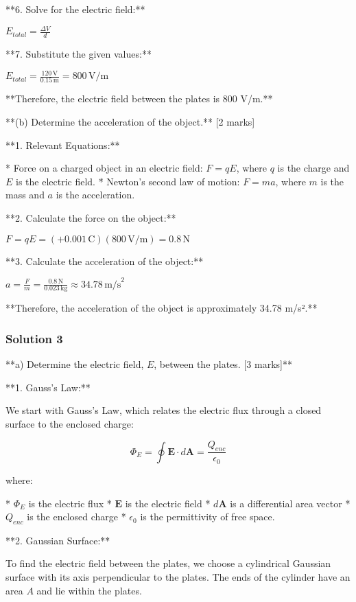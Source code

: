 \documentclass{article}
\begin{document}
**6. Solve for the electric field:**

$E_{total} = \frac{\Delta V}{d}$

**7. Substitute the given values:**

$E_{total} = \frac{120 \, \text{V}}{0.15 \, \text{m}} = 800 \, \text{V/m}$

**Therefore, the electric field between the plates is 800 V/m.**

**(b) Determine the acceleration of the object.** [2 marks]

**1. Relevant Equations:**

*   Force on a charged object in an electric field: $F = qE$, where $q$ is the charge and $E$ is the electric field.
*   Newton's second law of motion: $F = ma$, where $m$ is the mass and $a$ is the acceleration.

**2. Calculate the force on the object:**

$F = qE = (+0.001 \, \text{C})(800 \, \text{V/m}) = 0.8 \, \text{N}$

**3. Calculate the acceleration of the object:**

$a = \frac{F}{m} = \frac{0.8 \, \text{N}}{0.023 \, \text{kg}} \approx 34.78 \, \text{m/s}^2$

**Therefore, the acceleration of the object is approximately 34.78 m/s².** 

\subsubsection{Solution 3}
**a) Determine the electric field, $E$, between the plates. [3 marks]**

**1.  Gauss's Law:**

We start with Gauss's Law, which relates the electric flux through a closed surface to the enclosed charge:

\begin{equation*}
\Phi_E = \oint \mathbf{E} \cdot d\mathbf{A} = \frac{Q_{enc}}{\epsilon_0}
\end{equation*}

where:

* $\Phi_E$ is the electric flux
* $\mathbf{E}$ is the electric field
* $d\mathbf{A}$ is a differential area vector 
* $Q_{enc}$ is the enclosed charge
* $\epsilon_0$ is the permittivity of free space.

**2. Gaussian Surface:**

To find the electric field between the plates, we choose a cylindrical Gaussian surface with its axis perpendicular to the plates. The ends of the cylinder have an area $A$ and lie within the plates.
\end{document}
